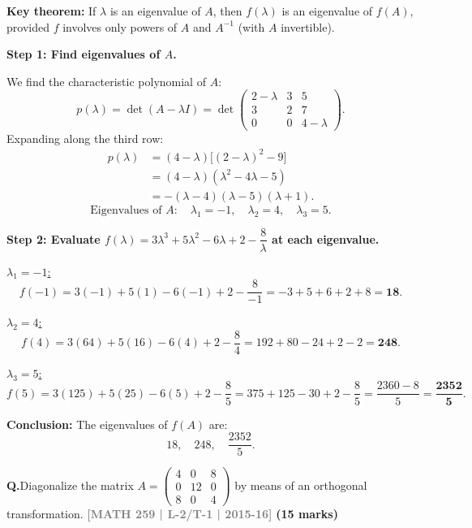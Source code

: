 \documentclass[12pt,a3paper]{article}
\newcommand{\yr}[1]{\hfill\textcolor{gray}{\small\textbf{[#1]}}}
\newcommand{\mk}[1]{\textcolor{orange!70!black}{\small\textbf{(#1 marks)}}}
\newcounter{qnum}
\newcommand{\Q}[1]{%
  \needspace{4\baselineskip}
  \refstepcounter{qnum}
  \vspace{6pt}
  \noindent\textbf{Q\theqnum.}\enspace #1\par
}
\begin{document}
\begin{tcolorbox}[enhanced,breakable,
  colback=cE!4,colframe=cE,boxrule=0.8pt,arc=5pt,
  title={\textbf{Answer --- Eigenvalues of $f(A)=3A^3+5A^2-6A+2I-8A^{-1}$}},
  fonttitle=\bfseries\color{white},colbacktitle=cE]

\textbf{Key theorem:} If $\lambda$ is an eigenvalue of $A$, then $f(\lambda)$ is an eigenvalue of $f(A)$, provided $f$ involves only powers of $A$ and $A^{-1}$ (with $A$ invertible).

\medskip
\textbf{Step 1: Find eigenvalues of $A$.}

We find the characteristic polynomial of $A$:
\[
p(\lambda) = \det(A-\lambda I) = \det\begin{pmatrix}2-\lambda&3&5\\3&2&7\\0&0&4-\lambda\end{pmatrix}.
\]
Expanding along the third row:
\begin{align*}
p(\lambda) &= (4-\lambda) \bigl[ (2-\lambda)^2 - 9 \bigr] \\
           &= (4-\lambda) ( \lambda^2 - 4\lambda - 5 ) \\
           &= -(\lambda-4)(\lambda-5)(\lambda+1).
\end{align*}
\[
\text{Eigenvalues of }A:\quad \lambda_1=-1,\quad\lambda_2=4,\quad\lambda_3=5.
\]

\textbf{Step 2: Evaluate $f(\lambda)=3\lambda^3+5\lambda^2-6\lambda+2-\dfrac{8}{\lambda}$ at each eigenvalue.}

\underline{$\lambda_1=-1$:}
\[
f(-1)=3(-1)+5(1)-6(-1)+2-\frac{8}{-1}=-3+5+6+2+8=\mathbf{18}.
\]

\underline{$\lambda_2=4$:}
\[
f(4)=3(64)+5(16)-6(4)+2-\frac{8}{4}=192+80-24+2-2=\mathbf{248}.
\]

\underline{$\lambda_3=5$:}
\[
f(5)=3(125)+5(25)-6(5)+2-\frac{8}{5}=375+125-30+2-\frac{8}{5}=\frac{2360-8}{5}=\mathbf{\dfrac{2352}{5}}.
\]

\textbf{Conclusion:} The eigenvalues of $f(A)$ are:
\[
\boxed{18,\quad 248,\quad \frac{2352}{5}.}
\]

\end{tcolorbox}

\Q{Diagonalize the matrix $A = \begin{pmatrix} 4 & 0 & 8 \\ 0 & 12 & 0 \\ 8 & 0 & 4 \end{pmatrix}$ by means of an orthogonal transformation.
\yr{MATH 259 | L-2/T-1 | 2015-16} \mk{15}}
\end{document}
